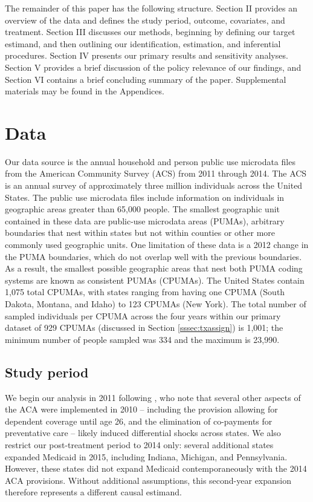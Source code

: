 \documentclass[12pt]{article}
\begin{document}
The remainder of this paper has the following structure. Section II provides an overview of the data and defines the study period, outcome, covariates, and treatment. Section III discusses our methods, beginning by defining our target estimand, and then outlining our identification, estimation, and inferential procedures. Section IV presents our primary results and sensitivity analyses. Section V provides a brief discussion of the policy relevance of our findings, and Section VI contains a brief concluding summary of the paper. Supplemental materials may be found in the Appendices.

\section{Data}

Our data source is the annual household and person public use microdata files from the American Community Survey (ACS) from 2011 through 2014. The ACS is an annual survey of approximately three million individuals across the United States. The public use microdata files include information on individuals in geographic areas greater than 65,000 people. The smallest geographic unit contained in these data are public-use microdata areas (PUMAs), arbitrary boundaries that nest within states but not within counties or other more commonly used geographic units. One limitation of these data is a 2012 change in the PUMA boundaries, which do not overlap well with the previous boundaries. As a result, the smallest possible geographic areas that nest both PUMA coding systems are known as consistent PUMAs (CPUMAs). The United States contain 1,075 total CPUMAs, with states ranging from having one CPUMA (South Dakota, Montana, and Idaho) to 123 CPUMAs (New York). The total number of sampled individuals per CPUMA across the four years within our primary dataset of 929 CPUMAs (discussed in Section \ref{sssec:txassign}) is 1,001; the minimum number of people sampled was 334 and the maximum is 23,990.

\subsection{Study period}

We begin our analysis in 2011 following \cite{courtemanche2017early}, who note that several other aspects of the ACA were implemented in 2010 -- including the provision allowing for dependent coverage until age 26, and the elimination of co-payments for preventative care -- likely induced differential shocks across states. We also restrict our post-treatment period to 2014 only: several additional states expanded Medicaid in 2015, including Indiana, Michigan, and Pennsylvania. However, these states did not expand Medicaid contemporaneously with the 2014 ACA provisions. Without additional assumptions, this second-year expansion therefore represents a different causal estimand. 
\end{document}
